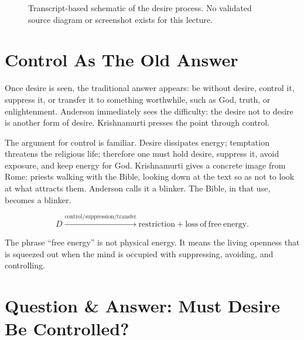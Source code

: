 \documentclass[11pt,oneside]{book}
\begin{document}
\begin{figure}
\centering
{}

Transcript-based schematic of the desire process. No validated source diagram or screenshot exists for this lecture.
\end{figure}

\section{Control As The Old Answer}

Once desire is seen, the traditional answer appears: be without desire, control it, suppress it, or transfer it to something worthwhile, such as God, truth, or enlightenment. Anderson immediately sees the difficulty: the desire not to desire is another form of desire. Krishnamurti presses the point through control.

The argument for control is familiar. Desire dissipates energy; temptation threatens the religious life; therefore one must hold desire, suppress it, avoid exposure, and keep energy for God. Krishnamurti gives a concrete image from Rome: priests walking with the Bible, looking down at the text so as not to look at what attracts them. Anderson calls it a blinker. The Bible, in that use, becomes a blinker.

\begin{equation}
D
\xrightarrow{\mathrm{control/suppression/transfer}}
\mathrm{restriction}
+
\mathrm{loss\ of\ free\ energy}.
\end{equation}

The phrase ``free energy'' is not physical energy. It means the living openness that is squeezed out when the mind is occupied with suppressing, avoiding, and controlling.

\section{Question \& Answer: Must Desire Be Controlled?}
\end{document}
